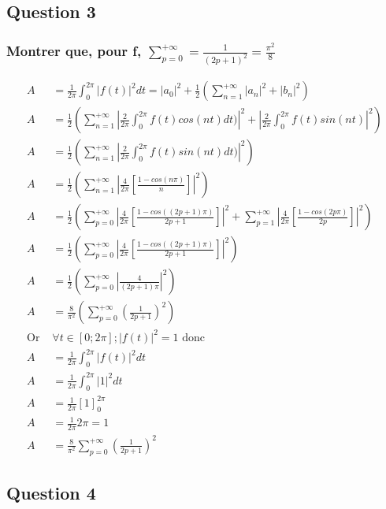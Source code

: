 \documentclass[a4paper,10pt]{report}
\begin{document}
\subsection{Question 3}
\subsubsection{Montrer que, pour f, $\sum_{p=0}^{+\infty} = \frac{1}{(2p + 1)^2} = \frac{\pi^2}{8}$}
\begin{align*}
A &= \frac{1}{2\pi}\int_{0}^{2\pi} |f(t)|^2 dt = |a_0|^2 + \frac{1}{2}(\sum_{n=1}^{+\infty} |a_n|^2 + |b_n|^2)\\
A &= \frac{1}{2}(\sum_{n=1}^{+\infty} |\frac{2}{2\pi} \int_{0}^{2\pi} f(t)cos(nt)dt)|^2 + |\frac{2}{2\pi}\int_{0}^{2\pi}f(t)sin(nt)|^2)\\
A &= \frac{1}{2}(\sum_{n=1}^{+\infty} |\frac{2}{2\pi} \int_{0}^{2\pi} f(t)sin(nt)dt)|^2)\\
A &= \frac{1}{2}(\sum_{n=1}^{+\infty} |\frac{4}{2\pi}[\frac{1-cos(n\pi)}{n}]|^2)\\
A &= \frac{1}{2}(\sum_{p=0}^{+\infty} |\frac{4}{2\pi}[\frac{1-cos((2p+1)\pi)}{2p+1}]|^2 + \sum_{p=1}^{+\infty} |\frac{4}{2\pi}[\frac{1-cos(2p\pi)}{2p}]|^2)\\
A &= \frac{1}{2}(\sum_{p=0}^{+\infty} |\frac{4}{2\pi}[\frac{1-cos((2p+1)\pi)}{2p+1}]|^2)\\
A &= \frac{1}{2}(\sum_{p=0}^{+\infty} |\frac{4}{(2p+1)\pi}|^2)\\
A &= \frac{8}{\pi^2}(\sum_{p=0}^{+\infty} (\frac{1}{2p+1})^2)\\
\text{Or } &\forall t \in [0;2\pi]; |f(t)|^2 = 1 \text{ donc}\\
A &= \frac{1}{2\pi}\int_{0}^{2\pi} |f(t)|^2 dt\\
A &= \frac{1}{2\pi}\int_{0}^{2\pi} |1|^2 dt\\
A &= \frac{1}{2\pi}[1]_0^{2\pi}\\
A &= \frac{1}{2\pi}2\pi = 1\\
A &= \frac{8}{\pi^2}\sum_{p=0}^{+\infty}(\frac{1}{2p+1})^2
\end{align*}

\subsection{Question 4}
\end{document}
